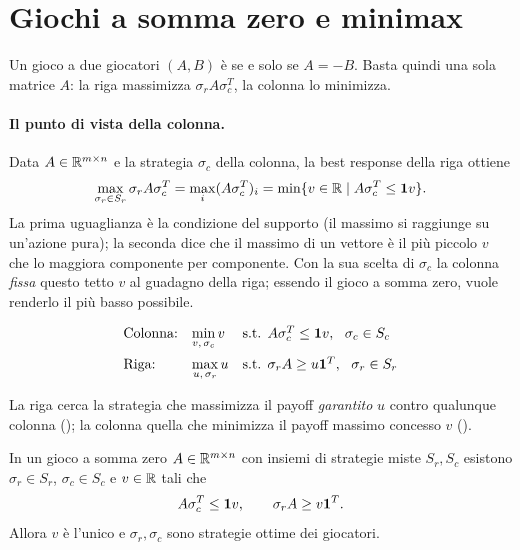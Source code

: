\section{Giochi a somma zero e minimax}

\begin{definizione}
Un gioco a due giocatori $(A,B)$ è  se e solo se $A = -B$. Basta quindi una
sola matrice $A$: la riga massimizza $\sigma_r A\sigma_c^T$, la colonna lo minimizza.
\end{definizione}

\paragraph{Il punto di vista della colonna.}
Data $A \in \mathbb{R}^{m\times n}$ e la strategia $\sigma_c$ della colonna, la best response della
riga ottiene
\[
  \max_{\sigma_r \in S_r} \sigma_r A\sigma_c^T = \max_i (A\sigma_c^T)_i
  = \min\{ v \in \mathbb{R} \mid A\sigma_c^T \le \mathbf{1} v \}.
\]
La prima uguaglianza è la condizione del supporto (il massimo si raggiunge su un'azione
pura); la seconda dice che il massimo di un vettore è il più piccolo $v$ che lo maggiora
componente per componente. Con la sua scelta di $\sigma_c$ la colonna \emph{fissa} questo
tetto $v$ al guadagno della riga; essendo il gioco a somma zero, vuole renderlo il più basso
possibile.

\begin{definizione}
\[
\begin{array}{lll}
\text{Colonna:} & \displaystyle\min_{v,\,\sigma_c} v
  & \text{s.t. } A\sigma_c^T \le \mathbf{1} v,\ \ \sigma_c \in S_c\\[10pt]
\text{Riga:} & \displaystyle\max_{u,\,\sigma_r} u
  & \text{s.t. } \sigma_r A \ge u\mathbf{1}^T,\ \ \sigma_r \in S_r
\end{array}
\]
\end{definizione}
La riga cerca la strategia che massimizza il payoff \emph{garantito} $u$ contro qualunque
colonna (); la colonna quella che minimizza il payoff massimo concesso $v$
().

\begin{teorema}
In un gioco a somma zero $A \in \mathbb{R}^{m\times n}$ con insiemi di strategie miste $S_r, S_c$
esistono $\sigma_r \in S_r$, $\sigma_c \in S_c$ e $v \in \mathbb{R}$ tali che
\[
  A\sigma_c^T \le \mathbf{1} v, \qquad \sigma_r A \ge v\mathbf{1}^T .
\]
Allora $v$ è l'unico  e $\sigma_r, \sigma_c$ sono strategie ottime dei
giocatori.
\end{teorema}

